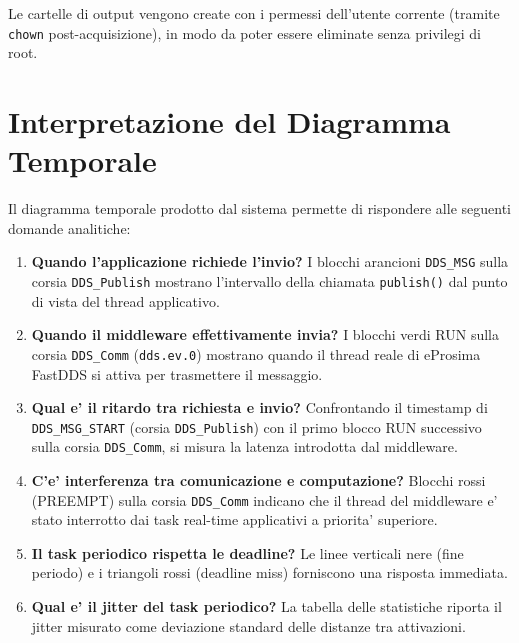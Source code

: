 Le cartelle di output vengono create con i permessi dell'utente corrente
(tramite \texttt{chown} post-acquisizione), in modo da poter essere
eliminate senza privilegi di root.


\section{Interpretazione del Diagramma Temporale}
\label{sec:interpretazione}

Il diagramma temporale prodotto dal sistema permette di rispondere
alle seguenti domande analitiche:

\begin{enumerate}
    \item \textbf{Quando l'applicazione richiede l'invio?}
          I blocchi arancioni \texttt{DDS\_MSG} sulla corsia
          \texttt{DDS\_Publish} mostrano l'intervallo della chiamata
          \texttt{publish()} dal punto di vista del thread applicativo.
    \item \textbf{Quando il middleware effettivamente invia?}
          I blocchi verdi RUN sulla corsia \texttt{DDS\_Comm}
          (\texttt{dds.ev.0}) mostrano quando il thread reale di
          eProsima FastDDS si attiva per trasmettere il messaggio.
    \item \textbf{Qual e' il ritardo tra richiesta e invio?}
          Confrontando il timestamp di \texttt{DDS\_MSG\_START}
          (corsia \texttt{DDS\_Publish}) con il primo blocco RUN
          successivo sulla corsia \texttt{DDS\_Comm}, si misura la
          latenza introdotta dal middleware.
    \item \textbf{C'e' interferenza tra comunicazione e computazione?}
          Blocchi rossi (PREEMPT) sulla corsia \texttt{DDS\_Comm}
          indicano che il thread del middleware e' stato interrotto
          dai task real-time applicativi a priorita' superiore.
    \item \textbf{Il task periodico rispetta le deadline?}
          Le linee verticali nere (fine periodo) e i triangoli rossi
          (deadline miss) forniscono una risposta immediata.
    \item \textbf{Qual e' il jitter del task periodico?}
          La tabella delle statistiche riporta il jitter misurato
          come deviazione standard delle distanze tra attivazioni.
\end{enumerate}
